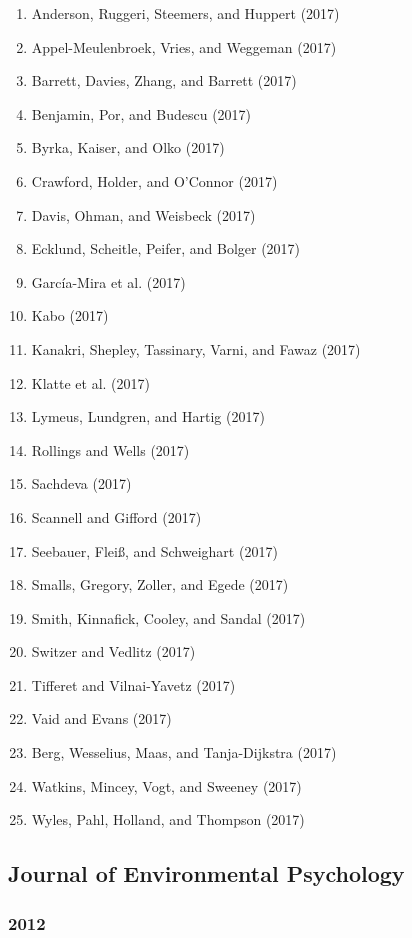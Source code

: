 \documentclass[english,man]{apa6}
\providecommand{\tightlist}{%
  \setlength{\itemsep}{0pt}\setlength{\parskip}{0pt}}
\theoremstyle{definition}
\theoremstyle{definition}
\theoremstyle{definition}
\theoremstyle{remark}
\begin{document}
\begin{enumerate}
\def\labelenumi{\arabic{enumi})}
\tightlist
\item
  Anderson, Ruggeri, Steemers, and Huppert (2017)
\item
  Appel-Meulenbroek, Vries, and Weggeman (2017)
\item
  Barrett, Davies, Zhang, and Barrett (2017)
\item
  Benjamin, Por, and Budescu (2017)
\item
  Byrka, Kaiser, and Olko (2017)
\item
  Crawford, Holder, and O'Connor (2017)
\item
  Davis, Ohman, and Weisbeck (2017)
\item
  Ecklund, Scheitle, Peifer, and Bolger (2017)
\item
  García-Mira et al. (2017)
\item
  Kabo (2017)
\item
  Kanakri, Shepley, Tassinary, Varni, and Fawaz (2017)
\item
  Klatte et al. (2017)
\item
  Lymeus, Lundgren, and Hartig (2017)
\item
  Rollings and Wells (2017)
\item
  Sachdeva (2017)
\item
  Scannell and Gifford (2017)
\item
  Seebauer, Fleiß, and Schweighart (2017)
\item
  Smalls, Gregory, Zoller, and Egede (2017)
\item
  Smith, Kinnafick, Cooley, and Sandal (2017)
\item
  Switzer and Vedlitz (2017)
\item
  Tifferet and Vilnai-Yavetz (2017)
\item
  Vaid and Evans (2017)
\item
  Berg, Wesselius, Maas, and Tanja-Dijkstra (2017)
\item
  Watkins, Mincey, Vogt, and Sweeney (2017)
\item
  Wyles, Pahl, Holland, and Thompson (2017)
\end{enumerate}

\subsection{Journal of Environmental
Psychology}\label{journal-of-environmental-psychology}

\subsubsection{2012}\label{section-22}
\end{document}
